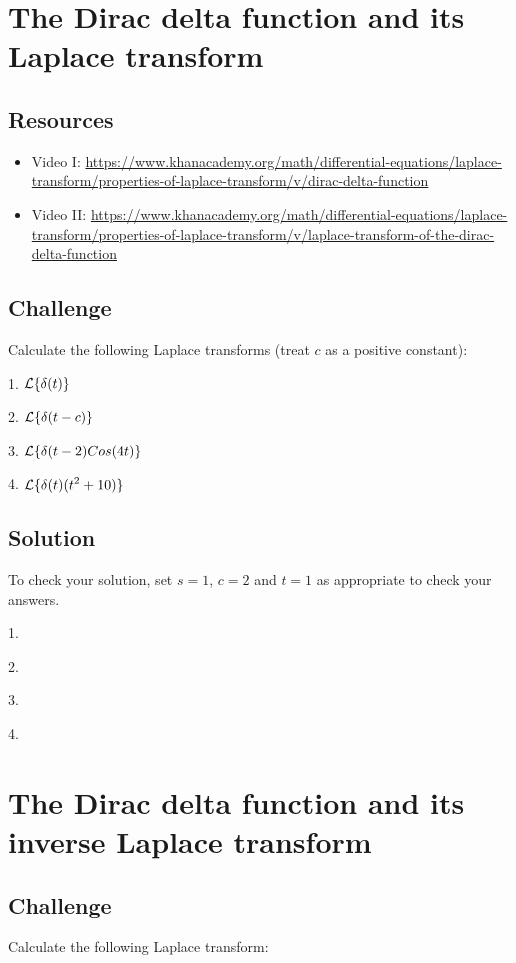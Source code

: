 \section{The Dirac delta function and its Laplace transform}

\subsection*{Resources}
\begin{itemize}
    \item Video I: \url{https://www.khanacademy.org/math/differential-equations/laplace-transform/properties-of-laplace-transform/v/dirac-delta-function}
    \item Video II: \url{https://www.khanacademy.org/math/differential-equations/laplace-transform/properties-of-laplace-transform/v/laplace-transform-of-the-dirac-delta-function}
\end{itemize}

\subsection*{Challenge}
Calculate the following Laplace transforms (treat $c$ as a positive constant):

1. $\displaystyle \mathcal{L}\{\delta(t)\}$

2. $\displaystyle \mathcal{L}\{\delta(t-c)\}$

3. $\displaystyle \mathcal{L}\{\delta(t-2) Cos(4 t)\}$

4. $\displaystyle \mathcal{L}\{\delta(t) (t^2+10)\}$

\subsection*{Solution}
To check your solution, set $s=1$, $c=2$ and $t=1$ as appropriate to check your answers.

1. 

2. 

3. 

4. 




\newpage
\section{The Dirac delta function and its inverse Laplace transform}

\subsection*{Challenge}
Calculate the following Laplace transform:

